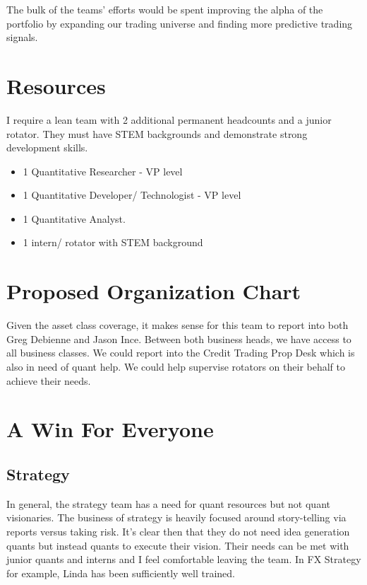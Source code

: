 \documentclass{article}
\begin{document}
The bulk of the teams' efforts would be spent improving the alpha of the portfolio by expanding our trading universe and finding more predictive trading signals.


\section{Resources}
I require a lean team with 2 additional permanent headcounts and a junior rotator. They must have STEM backgrounds and demonstrate strong development skills.
\begin{itemize}
\item 1 Quantitative Researcher - VP level
\item 1 Quantitative Developer/ Technologist - VP level
\item 1 Quantitative Analyst. 
\item 1 intern/ rotator with STEM background
\end{itemize}



\section{Proposed Organization Chart}
Given the asset class coverage, it makes sense for this team to report into both Greg Debienne and Jason Ince. Between both business heads, we have access to all business classes. We could report into the Credit Trading Prop Desk which is also in need of quant help. We could help supervise rotators on their behalf to achieve their needs.


\section{A Win For Everyone}

\subsection{Strategy}
In general, the strategy team has a need for quant resources but not quant visionaries. The business of strategy is heavily focused around story-telling via reports versus taking risk. It's clear then that they do not need idea generation quants but instead quants to execute their vision. Their needs can be met with junior quants and interns and I feel comfortable leaving the team. In FX Strategy for example, Linda has been sufficiently well trained.

\end{document}

